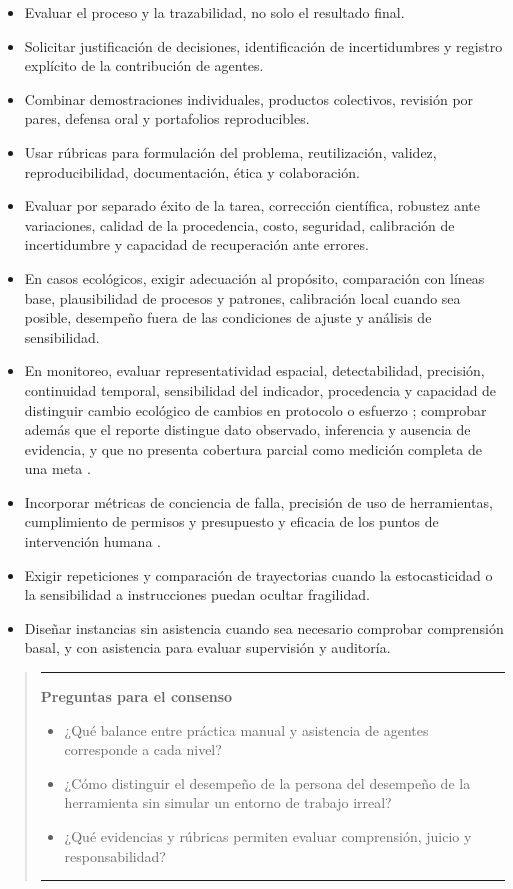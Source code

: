 \documentclass[11pt,a4paper]{article}
\newenvironment{preguntas}
  {\par\medskip\begin{quote}\color{azulieb}\hrule\smallskip
   \textbf{Preguntas para el consenso}\par\smallskip\begin{itemize}}
  {\end{itemize}\smallskip\hrule\end{quote}\par\medskip}
\begin{document}
\begin{itemize}
  \item Evaluar el proceso y la trazabilidad, no solo el resultado final.
  \item Solicitar justificación de decisiones, identificación de incertidumbres y
  registro explícito de la contribución de agentes.
  \item Combinar demostraciones individuales, productos colectivos, revisión por
  pares, defensa oral y portafolios reproducibles.
  \item Usar rúbricas para formulación del problema, reutilización, validez,
  reproducibilidad, documentación, ética y colaboración.
  \item Evaluar por separado éxito de la tarea, corrección científica,
  robustez ante variaciones, calidad de la procedencia, costo, seguridad,
  calibración de incertidumbre y capacidad de recuperación ante errores.
  \item En casos ecológicos, exigir adecuación al propósito, comparación con
  líneas base, plausibilidad de procesos y patrones, calibración local cuando sea
  posible, desempeño fuera de las condiciones de ajuste y análisis de sensibilidad.
  \item En monitoreo, evaluar representatividad espacial, detectabilidad, precisión,
  continuidad temporal, sensibilidad del indicador, procedencia y capacidad de
  distinguir cambio ecológico de cambios en protocolo o esfuerzo
  \citep{buckland2005monitoring}; comprobar además que el reporte distingue dato
  observado, inferencia y ausencia de evidencia, y que no presenta cobertura
  parcial como medición completa de una meta
  \citep{jetz2019ebv,affinito2025coverage}.
  \item Incorporar métricas de conciencia de falla, precisión de uso de
  herramientas, cumplimiento de permisos y presupuesto y eficacia de los puntos
  de intervención humana \citep{schneider2025generative}.
  \item Exigir repeticiones y comparación de trayectorias cuando la
  estocasticidad o la sensibilidad a instrucciones puedan ocultar fragilidad.
  \item Diseñar instancias sin asistencia cuando sea necesario comprobar
  comprensión basal, y con asistencia para evaluar supervisión y auditoría.
\end{itemize}

\begin{preguntas}
  \item ¿Qué balance entre práctica manual y asistencia de agentes corresponde a
  cada nivel?
  \item ¿Cómo distinguir el desempeño de la persona del desempeño de la
  herramienta sin simular un entorno de trabajo irreal?
  \item ¿Qué evidencias y rúbricas permiten evaluar comprensión, juicio y
  responsabilidad?
\end{preguntas}
\end{document}
